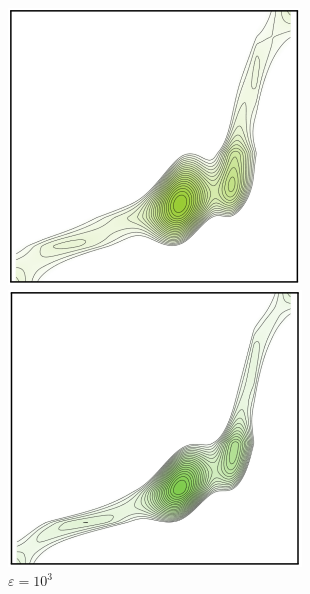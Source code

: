 \documentclass[cn,10pt,math=newtx,citestyle=gb7714-2015,bibstyle=gb7714-2015]{elegantbook}
\begin{document}
\begin{figure}[H]
\begin{minipage}{0.8\linewidth}
\begin{minipage}{0.19\linewidth}
		\caption*{$\varepsilon=5\times 10^3$}
	\end{minipage}
	\begin{minipage}{0.19\linewidth}
		\centering
		    \includegraphics[width=\linewidth]{figure/fig4.6/7.png}
		\caption*{$\varepsilon=10^3$}
	\end{minipage}
	\begin{minipage}{0.19\linewidth}
		\centering
		    \includegraphics[width=\linewidth]{figure/fig4.6/8.png}

\end{minipage}
\end{minipage}
\end{figure}
\end{document}
